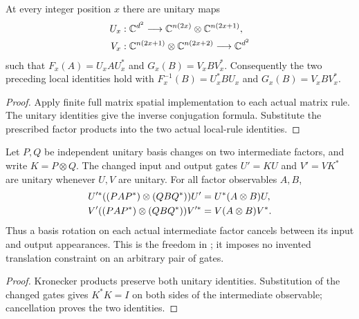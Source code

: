 \begin{lemma}
    \label{lem:qca_margolus_spatial_unitaries}
    \leanok
    At every integer position $x$ there are unitary maps
    \begin{align}
        U_x & : \mathbb C^{d^2}\longrightarrow
        \mathbb C^{n(2x)}\otimes\mathbb C^{n(2x+1)},\notag    \\
        V_x & : \mathbb C^{n(2x+1)}\otimes\mathbb C^{n(2x+2)}
        \longrightarrow\mathbb C^{d^2}
    \end{align}
    such that $F_x(A)=U_xAU_x^*$ and $G_x(B)=V_xBV_x^*$.
    Consequently the two preceding local identities hold with
    $F_x^{-1}(B)=U_x^*BU_x$ and $G_x(B)=V_xBV_x^*$.
\end{lemma}
\begin{proof}
    \leanok
    Apply finite full matrix spatial implementation to each actual
    matrix rule. The unitary identities give the inverse conjugation
    formula. Substitute the prescribed factor products into the two
    actual local-rule identities.
\end{proof}

\begin{lemma}
    \label{lem:qca_margolus_basis_freedom}
    \leanok
    Let $P,Q$ be independent unitary basis changes on two intermediate
    factors, and write $K=P\otimes Q$. The changed input and output gates
    $U'=KU$ and $V'=VK^*$ are unitary whenever $U,V$ are unitary. For all
    factor observables $A,B$,
    \begin{align}
        U'^*((PAP^*)\otimes(QBQ^*))U' & =U^*(A\otimes B)U,\notag \\
        V'((PAP^*)\otimes(QBQ^*))V'^* & =V(A\otimes B)V^*.
    \end{align}
    Thus a basis rotation on each actual intermediate factor cancels
    between its input and output appearances. This is the freedom in
    \cite[lines~1033--1041]{SchumacherWerner2004QCA}; it imposes no invented
    translation constraint on an arbitrary pair of gates.
\end{lemma}
\begin{proof}
    \leanok
    Kronecker products preserve both unitary identities. Substitution of
    the changed gates gives $K^*K=I$ on both sides of the intermediate
    observable; cancellation proves the two identities.
\end{proof}

